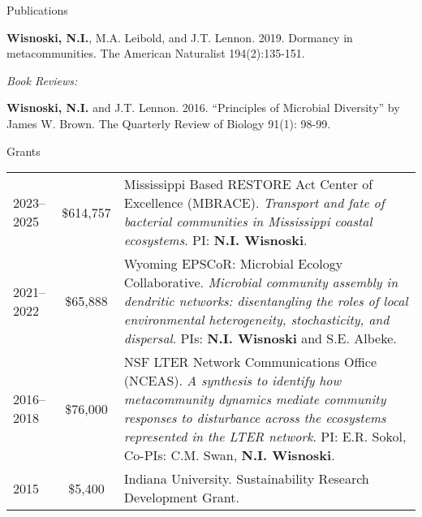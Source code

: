 \documentclass{resume} %
\begin{document}
\begin{rSection}{Publications}
\begin{etaremune}
\item {\bf Wisnoski, N.I.}, M.A. Leibold, and J.T. Lennon. 2019. Dormancy in metacommunities. The American Naturalist 194(2):135-151.

\end{etaremune}

\bigskip

{\it Book Reviews:}
\begin{etaremune}
\item {\bf Wisnoski, N.I.} and J.T. Lennon. 2016. \enquote{Principles of Microbial Diversity} by James W. Brown. The Quarterly Review of Biology 91(1): 98-99.

\end{etaremune}
\end{rSection}

\bigskip

\newpage
\begin{rSection}{Grants}
{\def\arraystretch{1.5}
\begin{tabulary}{0.95\textwidth}{lcL}
2023--2025 & \$614,757 & Mississippi Based RESTORE Act Center of Excellence (MBRACE). \textit{Transport and fate of bacterial communities in Mississippi coastal ecosystems}. PI: {\bf N.I. Wisnoski}. \\

2021--2022 & \$65,888 & Wyoming EPSCoR: Microbial Ecology Collaborative. \textit{Microbial community assembly in dendritic networks: disentangling the roles of local environmental heterogeneity, stochasticity, and dispersal}. PIs: {\bf N.I. Wisnoski} and S.E. Albeke.\\

2016--2018 & \$76,000 & NSF LTER Network Communications Office (NCEAS). \textit{A synthesis to identify how metacommunity dynamics mediate community responses to disturbance across the ecosystems represented in the LTER network}. PI: E.R. Sokol, Co-PIs: C.M. Swan, {\bf N.I. Wisnoski}.\\

2015 & \$5,400 & Indiana University. Sustainability Research Development Grant.

\end{tabulary}
}
\end{rSection}

\bigskip
\end{document}
